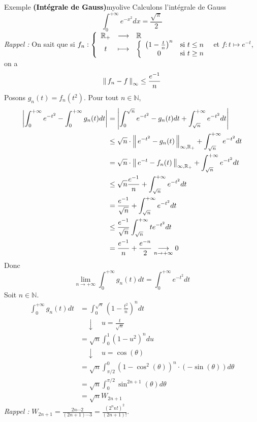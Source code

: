     \begin{omed}{Exemple \textbf{\textcolor{black}{(Intégrale de Gauss)}}}{myolive}
        Calculons l’intégrale de Gauss 
        \[ \int_{0}^{+\infty} e^{-x^2} dx = \frac{\sqrt{\pi}}{2} \] 
        \textit{\textcolor{myolive}{Rappel :}} On sait que si $\fonction{f_n}{\mathbb{R}_+}{\mathbb{R}}{t}{\sisi{\left(1-\frac{t}{n}\right)^n}{t \leq n}{0}{t \geq n}}$ et $f : t \mapsto e^{-t}$, on a 
        \[ \nnorm{\infty}{f_n - f} \leq \frac{e^{-1}}{n} \]   
        Posons $g_n(t) = f_n(t^2)$. Pour tout $n \in \mathbb{N}$, 
        \begin{align*}
            \abs{\int_{0}^{+\infty} e^{-t^2} - \int_{0}^{+\infty} g_n(t)dt} 
            &= \abs{\int_{0}^{\sqrt{n}} e^{-t^2} - g_n(t)dt + \int_{\sqrt{n}}^{+\infty} e^{-t^2}dt} \\
            &\leq \sqrt{n} \cdot \nnorm{\infty,\mathbb{R}_+}{e^{-t^2} -g_n(t)} + \int_{\sqrt{n}}^{+\infty} e^{-t^2}dt \\
            &= \sqrt{n} \cdot \nnorm{\infty,\mathbb{R}_+}{e^{-t} - f_n(t)} + \int_{\sqrt{n}}^{+\infty} e^{-t^2}dt \\
            &\leq \sqrt{n} \frac{e^{-1}}{n} + \int_{\sqrt{n}}^{+\infty} e^{-t^2}dt \\
            &= \frac{e^{-1}}{\sqrt{n}} + \int_{\sqrt{n}}^{+\infty} e^{-t^2}dt \\
            &\leq \frac{e^{-1}}{\sqrt{n}} \int_{\sqrt{n}}^{+\infty} t e^{-t^2}dt \\
            &= \frac{e^{-1}}{n} + \frac{e^{-n}}{2} \limi{n}{+\infty} 0 
        \end{align*}
        Donc 
        \[ \lim_{n \rightarrow +\infty} \int_{0}^{+\infty} g_n(t)dt = \int_{0}^{+\infty} e^{-t^2}dt \]   
        Soit $n \in \mathbb{N}$.
        \begin{align*}
            \int_{0}^{+\infty} g_n(t)dt 
            &= \int_{0}^{\sqrt{n}} \left(1 - \frac{t^2}{n}\right)^n dt \\
            & \quad \downarrow \quad u = \frac{t}{\sqrt{n}} \\
            &= \sqrt{n} \int_{0}^{1} \left(1-u^2\right)^n du \\
            & \quad \downarrow \quad u = \cos(\theta) \\
            &= \sqrt{n} \int_{\pi / 2}^{0} (1 -\cos^2(\theta))^n \cdot (-\sin(\theta))d\theta \\
            &= \sqrt{n} \int_{0}^{\pi / 2} \sin^{2n+1} (\theta) d\theta \\
            &= \sqrt{n} W_{2n+1}
        \end{align*}
        \textit{\textcolor{myolive}{Rappel :}} $W_{2n+1} = \frac{2n \cdots 2}{(2n+1) \cdots 3} = \frac{\left(2^n n!\right)^2}{(2n+1)!}$. 


\end{omed}
